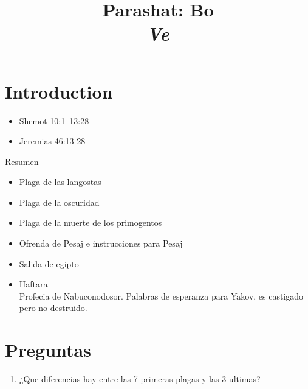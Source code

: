 \documentclass[conference]{IEEEtran}
\title{Parashat: Bo\\ \textit{Ve}}
\author{\IEEEauthorblockN{Kunst, James Jules Waldemar}
\IEEEauthorblockA{Bet-Melej Haba}}
\begin{document}
\maketitle


\section{Introduction}
\begin{itemize}
\item
Shemot 10:1–13:28
\item 
Jeremias 46:13-28
\end{itemize}

Resumen
\begin{itemize}
\item 
Plaga de las langostas
\item
Plaga de la oscuridad
\item
Plaga de la muerte de los primogentos
\item
Ofrenda de Pesaj e instrucciones para Pesaj
\item
Salida de egipto
\item
Haftara \\
Profecia de Nabuconodosor. Palabras de esperanza para Yakov, es castigado pero no destruido.
\end{itemize}


\section{Preguntas}

\begin{enumerate}
\item ¿Que diferencias hay entre las 7 primeras plagas y las 3 ultimas?
\end{enumerate}
\end{document}
